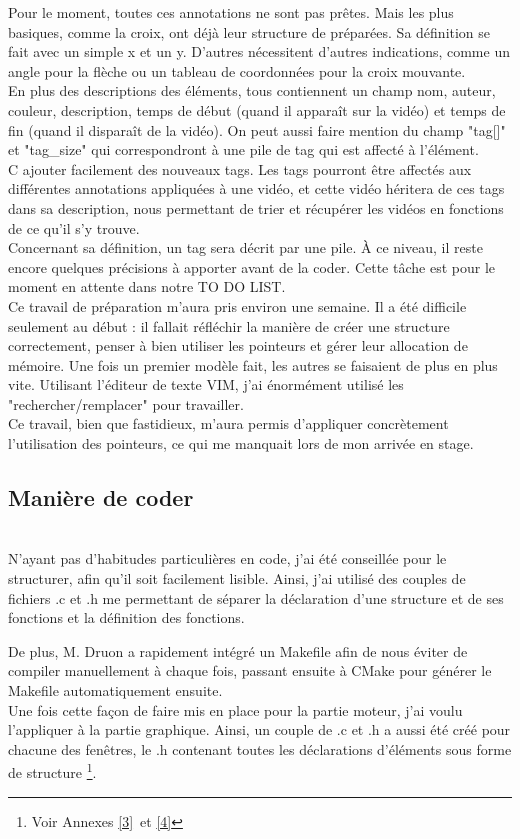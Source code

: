 \documentclass[11pt,french,a4paper]{report}
\begin{document}
Pour le moment, toutes ces annotations ne sont pas prêtes. Mais les plus basiques, comme la croix, ont déjà leur structure de préparées.
Sa définition se fait avec un simple x et un y. D'autres nécessitent d'autres indications, comme un angle pour la flèche
ou un tableau de coordonnées pour la croix mouvante. \\
En plus des descriptions des éléments, tous contiennent un champ nom, auteur, couleur, description, temps de début 
(quand il apparaît sur la vidéo) et temps de fin (quand il disparaît de la vidéo). 
On peut aussi faire mention du champ "tag[]" et "tag\_size" qui correspondront à une pile de tag qui est affecté à l'élément. \\
C
ajouter facilement des nouveaux tags. Les tags pourront être affectés aux différentes annotations appliquées
à une vidéo, et cette vidéo héritera de ces tags dans sa description, nous permettant de trier et récupérer les vidéos 
en fonctions de ce qu'il s'y trouve. \\
Concernant sa définition, un tag sera décrit par une pile. À ce niveau, il reste encore quelques précisions à apporter
avant de la coder. Cette tâche est pour le moment en attente dans notre TO DO LIST.\\
Ce travail de préparation m'aura pris environ une semaine. Il a été difficile seulement au début : il fallait réfléchir 
la manière de créer une structure correctement, penser à bien utiliser les pointeurs et gérer leur allocation de
mémoire. Une fois un premier modèle fait, les autres se faisaient de plus en plus vite. Utilisant l'éditeur de texte VIM, j'ai 
énormément utilisé les "rechercher/remplacer" pour travailler. \\
Ce travail, bien que fastidieux, m'aura permis d'appliquer concrètement l'utilisation des pointeurs, ce qui 
me manquait lors de mon arrivée en stage. \\ 

        \subsection{Manière de coder}\\
N'ayant pas d'habitudes particulières en code, j'ai été conseillée pour le structurer, afin qu'il 
soit facilement lisible. Ainsi, j'ai utilisé des couples de fichiers .c et .h me permettant de séparer 
la déclaration d'une structure et de ses fonctions et la définition des fonctions.

De plus, M. Druon a rapidement intégré un Makefile afin de nous éviter de compiler manuellement à chaque fois, passant 
ensuite à CMake pour générer le Makefile automatiquement ensuite. \\
Une fois cette façon de faire mis en place pour la partie moteur, j'ai voulu l'appliquer à la partie
graphique. Ainsi, un couple de .c et .h a aussi été créé pour chacune des fenêtres, le .h contenant 
toutes les déclarations d'éléments sous forme de structure \footnote{Voir Annexes \ref{3} et \ref{4}}. \\
\end{document}
